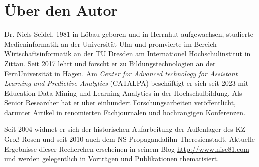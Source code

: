 \documentclass[a4paper,12pt,ngerman,
]{nisebook}
\begin{document}


\section*{Über den Autor}
Dr. Niels Seidel, 1981 in Löbau geboren und in Herrnhut aufgewachsen, studierte Medieninformatik an der Universität Ulm und promvierte im Bereich Wirtschaftsinformatik an der TU Dresden am Internationel Hochschulinstitut in Zittau. Seit 2017 lehrt und forscht er zu Bildungstechnologien an der FernUniversität in Hagen. Am \textit{Center for Advanced technology for Assistant Learning and Predictive Analytics} (CATALPA) beschäftigt er sich seit 2023 mit Education Data Mining und Learning Analytics in der Hochschulbildung. Als Senior Researcher hat er über einhundert Forschungsarbeiten veröffentlicht, darunter Artikel in renomierten Fachjournalen und hochrangigen Konferenzen.

Seit 2004 widmet er sich der historischen Aufarbeitung der Außenlager des KZ Groß-Rosen und seit 2010 auch dem NS-Propagandafilm Theresienstadt. Aktuelle Ergebnisse dieser Recherchen erscheinen in seinem Blog \url{http://www.nise81.com} und werden gelegentlich in Vorträgen und Publikationen thematisiert.
\end{document}
